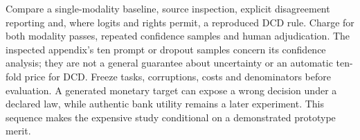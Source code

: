 Compare a single-modality baseline, source inspection, explicit disagreement
reporting and, where logits and rights permit, a reproduced DCD rule. Charge
for both modality passes, repeated confidence samples and human adjudication.
The inspected appendix's ten prompt or dropout samples concern its confidence
analysis; they are not a general guarantee about uncertainty or an automatic
ten-fold price for DCD. Freeze tasks, corruptions, costs and denominators before
evaluation. A generated monetary target can expose a wrong decision under a
declared law, while authentic bank utility remains a later experiment. This
sequence makes the expensive study conditional on a demonstrated prototype merit.
